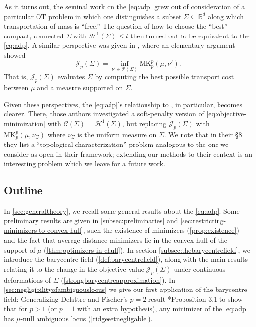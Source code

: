 \documentclass[preprint, reqno]{amsart}
\theoremstyle{definition}
\numberwithin{equation}{section}
\begin{document}
As it turns out, the seminal work on the \eqref{eq:adp}
\cite{Buttazzo02} grew out of consideration of a particular OT problem
in which one distinguishes a subset $\Sigma \subseteq \mathbb R^d$
along which transportation of mass is ``free.'' The question of how to
choose the ``best'' compact, connected $\Sigma$ with $\mathcal
H^1(\Sigma) \leq l$ then turned out to be equivalent to the
\eqref{eq:adp}. A similar perspective was given in \cite[Proposition
2.7]{Kobayashi24}, where an elementary argument showed
\[
 \mathscr  J_p(\Sigma) = \inf_{\nu' \in \mathcal P(\Sigma)}
 \mathrm{MK}_p^p(\mu, \nu').
\]
That is, $\mathscr J_p(\Sigma)$ evaluates $\Sigma$ by computing the
best possible transport cost between $\mu$ and a measure supported on
$\Sigma$.

Given these perspectives, the \ref{eq:adp}'s relationship to
\cite{Chambolle2023Apr}, in particular, becomes clearer. There, those
authors investigated a soft-penalty version of
\eqref{eq:objective-minimization} with $\mathscr C(\Sigma) = \mathcal
H^1(\Sigma)$, but replacing $\mathscr J_p(\Sigma)$ with
$\mathrm{MK}_p^p(\mu, \nu_\Sigma)$ where $\nu_\Sigma$ is the uniform
measure on $\Sigma$. We note that in their \S 8 they list a
``topological characterization'' problem analogous to the one we
consider as open in their framework; extending our methods to their
context is an interesting problem which we leave for a future work.




\subsection{Outline}

In \cref{sec:generaltheory}, we recall some general results about the
\eqref{eq:adp}. Some preliminary results are given in
\cref{subsec:preliminaries} and
\cref{sec:restricting-minimizers-to-convex-hull}, such the existence
of minimizers (\cref{prop:existence}) and the fact that average
distance minimizers lie in the convex hull of the support of $\mu$
(\cref{thm:optimizers-in-chull}). In section
\cref{subsec:thebarycentrefield}, we introduce the barycentre field
(\cref{def:barycentrefield}), along with the main results relating it
to the change in the objective value $\mathscr{J}_p(\Sigma)$ under
continuous deformations of $\Sigma$
(\cref{strongbarycentreapproximation}). In
\cref{sec:negligibilityofambiguouslocus} we give our first application
of the barycentre field: Generalizing Delattre and Fischer's $p=2$
result \cite{Delattre17}*{Proposition 3.1} to show that for $p > 1$
(or $p=1$ with an extra hypothesis), any minimizer of the
\eqref{eq:adp} has $\mu$-null ambiguous locus
(\cref{ridgesetnegligable}).
\end{document}
